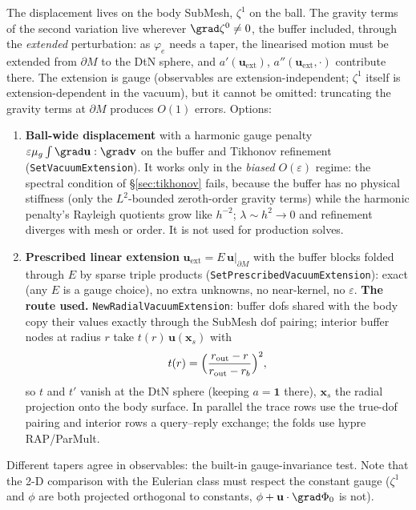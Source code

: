 \documentclass[11pt]{article}
\numberwithin{equation}{section}
\theoremstyle{remark}
\newcommand{\eps}{\varepsilon}
\newcommand{\vu}{\mathbf{u}}
\newcommand{\vv}{\mathbf{v}}
\newcommand{\vx}{\mathbf{x}}
\newcommand{\code}[1]{\texttt{#1}}
\begin{document}
The displacement lives on the body SubMesh, $\zeta^1$ on the ball. The
gravity terms of the second variation live wherever $\grad\zeta^0\neq0$,
the buffer included, through the \emph{extended} perturbation: as
$\varphi_e$ needs a taper, the linearised motion must be extended from
$\partial M$ to the DtN sphere, and $a'(\vu_{\mathrm{ext}})$,
$a''(\vu_{\mathrm{ext}},\cdot)$ contribute there. The extension is gauge
(observables are extension-independent; $\zeta^1$ itself is
extension-dependent in the vacuum), but it cannot be omitted: truncating
the gravity terms at $\partial M$ produces $O(1)$ errors. Options:
\begin{enumerate}
\item[(a)] \textbf{Ball-wide displacement} with a harmonic gauge penalty
  $\eps\mu_g\int\grad\vu:\grad\vv$ on the buffer and Tikhonov refinement
  (\code{SetVacuumExtension}). It works only in the \emph{biased} $O(\eps)$
  regime: the spectral condition of \S\ref{sec:tikhonov} fails, because the
  buffer has no physical stiffness (only the $L^2$-bounded zeroth-order
  gravity terms) while the harmonic penalty's Rayleigh quotients grow like
  $h^{-2}$; $\lambda\sim h^2\to0$ and refinement diverges with mesh or
  order. It is not used for production solves.
\item[(b)] \textbf{Prescribed linear extension} $\vu_{\mathrm{ext}} =
  E\,\vu|_{\partial M}$ with the buffer blocks folded through $E$ by sparse
  triple products (\code{SetPrescribedVacuumExtension}): exact (any $E$ is a
  gauge choice), no extra unknowns, no near-kernel, no $\eps$. \textbf{The
  route used.} \code{NewRadialVacuumExtension}: buffer dofs shared with the
  body copy their values exactly through the SubMesh dof pairing; interior
  buffer nodes at radius $r$ take $t(r)\,\vu(\vx_s)$ with
  \begin{equation}
    t(r) = \Bigl(\frac{r_{\mathrm{out}} - r}{r_{\mathrm{out}} - r_b}\Bigr)^2,
  \end{equation}
  so $t$ and $t'$ vanish at the DtN sphere (keeping $a = \mathbf{1}$
  there), $\vx_s$ the radial projection onto the body surface. In parallel
  the trace rows use the true-dof pairing and interior rows a query--reply
  exchange; the folds use hypre RAP/ParMult.
\end{enumerate}
Different tapers agree in observables: the built-in gauge-invariance test.
Note that the 2-D comparison with the Eulerian class must respect the
constant gauge ($\zeta^1$ and $\phi$ are both projected orthogonal to
constants, $\phi + \vu\cdot\grad\Phi_0$ is not).
\end{document}

